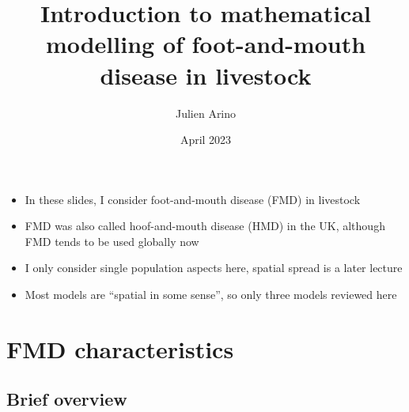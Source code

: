 \documentclass[aspectratio=43]{beamer}
\title{Introduction to mathematical modelling of foot-and-mouth disease in livestock}
\author{Julien Arino}
\date{April 2023}
\begin{document}

\begin{frame}
  \titlepage
\end{frame}
\addtocounter{page}{-1}


\begin{frame}
\begin{itemize}
  \item In these slides, I consider foot-and-mouth disease (FMD) in livestock
  \vfill
  \item FMD was also called hoof-and-mouth disease (HMD) in the UK, although FMD tends to be used globally now
  \vfill
  \item I only consider single population aspects here, spatial spread is a later lecture
  \vfill
  \item Most models are ``spatial in some sense'', so only three models reviewed here
\end{itemize}
\end{frame}


\section{FMD characteristics}

\subsection{Brief overview}
\end{document}
